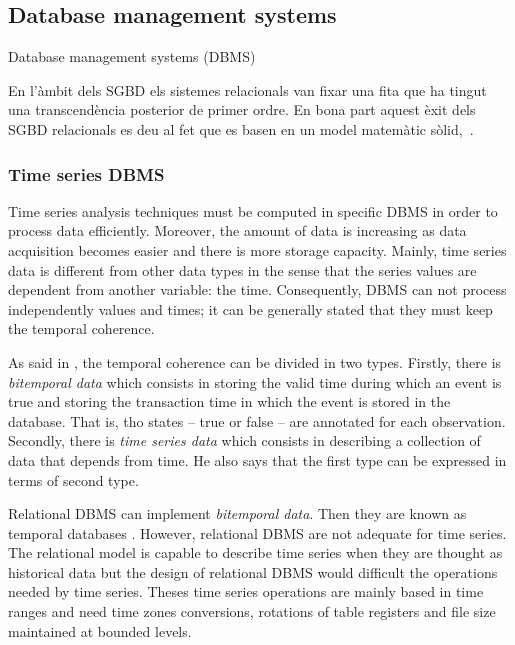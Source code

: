 \subsection{Database management systems}

Database management systems (DBMS)

En l'àmbit dels SGBD els sistemes relacionals van fixar una fita que ha tingut una transcendència posterior de  primer ordre. En bona part aquest èxit dels SGBD relacionals es deu al fet que es basen en un model matemàtic sòlid,~\cite{date}.

\subsubsection{Time series DBMS}

Time series analysis techniques must be computed in specific DBMS in order to process data efficiently. Moreover, the amount of data is increasing as data acquisition becomes easier and there is more storage capacity. 
Mainly, time series data is different from other data types in the sense that the series values are dependent from another variable: the time. Consequently, DBMS can not process independently values and times; it can be generally stated that they must keep the temporal coherence. 


As said in \textcite{assfalg08:thesis}, the temporal coherence can be divided in two types. Firstly, there is  \emph{bitemporal data} which consists in storing the valid time during which an event is true and storing the transaction time in which the event is stored in the database. That is, tho states -- true or false -- are annotated for each observation.  Secondly, there is \emph{time series data} which consists in describing a collection of data that depends from time. He also says that the first type can be expressed in terms of second type.

Relational DBMS can implement \emph{bitemporal data}. Then they are known as temporal databases \parencite[ch.\ 22]{date}. However, relational DBMS are not adequate for time series. The relational model is capable to describe time series when they are thought as historical data but the design of relational DBMS would difficult the operations  needed by time series. Theses time series operations are mainly based in time ranges and need time zones conversions, rotations of table registers and file size maintained at bounded levels.


